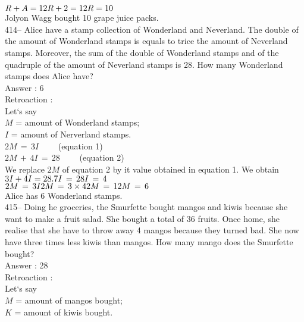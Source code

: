 ﻿\documentclass[letterpaper, 12pt]{article}
\begin{document}
$R+A=12\\
R+2=12\\
R=10$\\
Jolyon Wagg bought 10 grape juice packs.\\

414-- Alice have a stamp collection of Wonderland and Neverland. The double of the amount of Wonderland stamps is equals to trice the amount of Neverland stamps. Moreover, the sum of the double of Wonderland stamps and of the quadruple of the amount of Neverland stamps is 28. How many Wonderland stamps does Alice have?\\

Answer : 6\\

Retroaction : \\
Let`s say\\
$M$ = amount of Wonderland stamps;\\
$I$ = amount of Nerverland stamps.\\

$2M\,=\,3I \qquad $ (equation 1)\\
$2M\,+\,4I\,=\,28 \qquad $ (equation 2)\\
We replace $2M$ of equation 2 by it value obtained in equation 1. We obtain $3I+4I=28.\\
7I\,=\,28\\
I\,=\,4$\\

$2M\,=\,3I\\
2M\,=\,3\times4\\
2M\,=\,12\\
M\,=\,6$\\
Alice has 6 Wonderland stamps.\\

415-- Doing he groceries, the Smurfette bought mangos and kiwis because she want to make a fruit salad. She bought a total of 36 fruits. Once home, she realise that she have to throw away 4 mangos because they turned bad. She now have three times less kiwis than mangos. How many mango does the Smurfette bought?\\


Answer : 28\\

Retroaction : \\
Let`s say\\
$M$ = amount of mangos bought;\\
$K$ = amount of kiwis bought.\\
\end{document}
